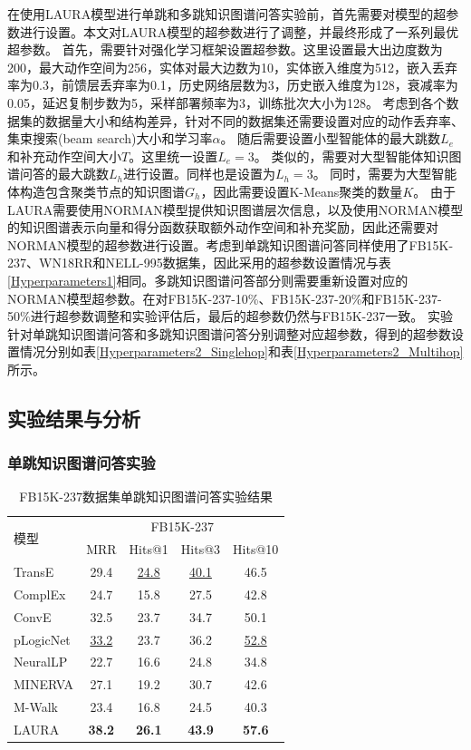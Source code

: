\documentclass[algorithmlist, AutoFakeBold, AutoFakeSlant, figurelist, tablelist, nomlist, engineering]{seuthesix}
\begin{document}
在使用LAURA模型进行单跳和多跳知识图谱问答实验前，首先需要对模型的超参数进行设置。本文对LAURA模型的超参数进行了调整，并最终形成了一系列最优超参数。
首先，需要针对强化学习框架设置超参数。这里设置最大出边度数为200，最大动作空间为256，实体对最大边数为10，实体嵌入维度为512，嵌入丢弃率为0.3，前馈层丢弃率为0.1，历史网络层数为3，历史嵌入维度为128，衰减率为0.05，延迟复制步数为5，采样部署频率为3，训练批次大小为128。
考虑到各个数据集的数据量大小和结构差异，针对不同的数据集还需要设置对应的动作丢弃率、集束搜索(beam search)大小和学习率$\alpha$。
随后需要设置小型智能体的最大跳数$L_e$和补充动作空间大小$T$。这里统一设置$L_e = 3$。
类似的，需要对大型智能体知识图谱问答的最大跳数$L_h$进行设置。同样也是设置为$L_h = 3$。
同时，需要为大型智能体构造包含聚类节点的知识图谱$G_h$，因此需要设置K-Means聚类的数量$K$。
由于LAURA需要使用NORMAN模型提供知识图谱层次信息，以及使用NORMAN模型的知识图谱表示向量和得分函数获取额外动作空间和补充奖励，因此还需要对NORMAN模型的超参数进行设置。考虑到单跳知识图谱问答同样使用了FB15K-237、WN18RR和NELL-995数据集，因此采用的超参数设置情况与表\ref{Hyperparameters1}相同。多跳知识图谱问答部分则需要重新设置对应的NORMAN模型超参数。在对FB15K-237-10\%、FB15K-237-20\%和FB15K-237-50\%进行超参数调整和实验评估后，最后的超参数仍然与FB15K-237一致。
实验针对单跳知识图谱问答和多跳知识图谱问答分别调整对应超参数，得到的超参数设置情况分别如表\ref{Hyperparameters2_Singlehop}和表\ref{Hyperparameters2_Multihop}所示。

\subsection{实验结果与分析}
\subsubsection{单跳知识图谱问答实验}

\begin{table}[t]
  \centering
  \caption{FB15K-237数据集单跳知识图谱问答实验结果}
  \begin{tabular*}{0.95\textwidth}{@{\extracolsep{\fill}}lcccc}
    \toprule[1pt]
    \multirow{2}{*}{模型} & \multicolumn{4}{c}{FB15K-237}   \\
      & MRR & Hits@1 & Hits@3 & Hits@10 \\ \hline
    TransE & 29.4 & \underline{24.8} & \underline{40.1} & 46.5 \\
    ComplEx & 24.7 & 15.8 & 27.5 & 42.8 \\
    ConvE & 32.5 & 23.7 & 34.7 & 50.1 \\
    pLogicNet & \underline{33.2} & 23.7 & 36.2 & \underline{52.8} \\
    NeuralLP & 22.7 & 16.6 & 24.8 & 34.8 \\
    MINERVA & 27.1 & 19.2 & 30.7 & 42.6 \\
    M-Walk & 23.4 & 16.8 & 24.5 & 40.3 \\
    LAURA & \textbf{38.2} & \textbf{26.1} & \textbf{43.9} & \textbf{57.6} \\
    \bottomrule[1pt]
  \end{tabular*}
  \label{Experiment2_FB15K-237}
\end{table}
\end{document}
